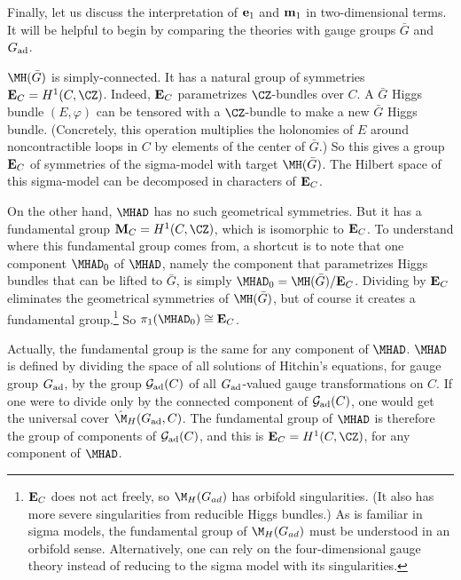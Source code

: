 \par{}

\def\MHBARG{\MH(\bar G)}

Finally, let us discuss the interpretation of ${\bf e}_1$ and
${\bf m}_1$ in two-dimensional terms. It will be helpful to begin
by comparing the theories with gauge groups $\bar G$ and
$G_{\rm{ad}}$.

$\MHBARG$ is simply-connected.  It has a natural group of
symmetries ${\bf E}_C=H^1(C,\CZ)$.  Indeed, ${\bf E}_C$
parametrizes $\CZ$-bundles over $C$.  A $\bar G$ Higgs bundle
$(E,\varphi)$ can be tensored with a $\CZ$-bundle to make a new
$\bar G$ Higgs bundle.  (Concretely, this operation multiplies the
holonomies of $E$ around noncontractible loops in $C$ by elements
of the center of $\bar G$.)  So this gives a group ${\bf E}_C$ of
symmetries of the sigma-model with target $\MHBARG$. The Hilbert
space of this sigma-model can be decomposed in characters of ${\bf
E}_C$.

On the other hand, $\MHAD$ has no such geometrical symmetries. But
it has a fundamental group ${\bf M}_C=H^1(C,\CZ)$, which is
isomorphic to ${\bf E}_C$. To understand where this fundamental
group comes from, a shortcut is to note that one component
$\MHAD_0$ of $\MHAD$, namely the component that parametrizes Higgs
bundles that can be lifted to $\bar G$, is simply
$\MHAD_0=\MHBARG/{\bf E}_C$.  Dividing by ${\bf E}_C$ eliminates
the geometrical symmetries of $\MHBARG$, but of course it creates
a fundamental group.\footnote{ ${\bf E}_C$ does not act freely, so $\M_H(G_{ad})$
 has orbifold singularities.  (It also has more severe singularities from reducible
 Higgs bundles.)
As is familiar in
sigma models, the fundamental group of $\M_H(G_{ad})$ must be understood in
an orbifold
sense.  Alternatively, one can rely on the four-dimensional gauge theory
instead of reducing
to the sigma model with its singularities.} So $\pi_1(\MHAD_0)\cong {\bf E}_C$.

Actually, the fundamental group is the same for any component of
$\MHAD$.  $\MHAD$ is defined by dividing the space of all
solutions of Hitchin's equations, for gauge group $G_{\rm {ad}}$,
by the group ${\cal G}_{\rm{ad}}(C)$ of all $G_{\rm{ad}}$-valued
gauge transformations on $C$. If one were to divide only by the
connected component of ${\cal G}_{\rm{ad}}(C)$, one would get the
universal cover $\hat\M_H(G_{\rm {ad}},C)$.  The fundamental group
of $\MHAD$ is therefore the group of components of ${\cal G}_{\rm
ad}(C)$, and this is ${\bf E}_C=H^1(C,\CZ)$, for any component of
$\MHAD$.

